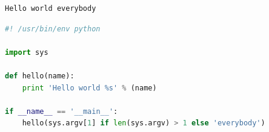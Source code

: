 \begin{lstlisting}[language={},caption={Standard output},label={lst:myname:outhello}]
Hello world everybody
\end{lstlisting}

\begin{lstlisting}[language={Python},caption={My first program},label={lst:myname:helloword}]
#! /usr/bin/env python

import sys

def hello(name):
    print 'Hello world %s' % (name)

if __name__ == '__main__':
    hello(sys.argv[1] if len(sys.argv) > 1 else 'everybody')
\end{lstlisting}



%
%
